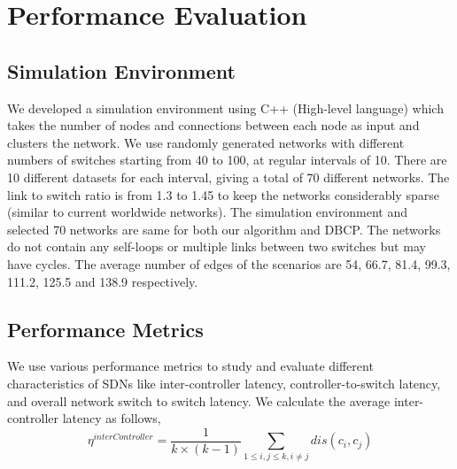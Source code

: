 \documentclass{IEEEtran}
\begin{document}
	\section{Performance Evaluation} \label{performance}
	
	\subsection{Simulation Environment} \label{simulationEnv}
	We developed a simulation environment using C++ (High-level language) which takes the number of nodes and connections between each node as input and clusters the network. We use randomly generated networks with different numbers of switches starting from 40 to 100, at regular intervals of 10. There are 10 different datasets for each interval, giving a total of 70 different networks. The link to switch ratio is from 1.3 to 1.45 to keep the networks considerably sparse (similar to current worldwide networks). The simulation environment and selected 70 networks are same for both our algorithm and DBCP. The networks do not contain any self-loops or multiple links between two switches but may have cycles. The average number of edges of the scenarios are 54, 66.7, 81.4, 99.3, 111.2, 125.5 and 138.9 respectively.
	
	\subsection{Performance Metrics}
	We use various performance metrics to study and evaluate different characteristics of SDNs like inter-controller latency, controller-to-switch latency, and overall network switch to switch latency. We calculate the average inter-controller latency as follows,
	\begin{equation} \label{eqn:interController}
	\eta^{interController} = \frac{1}{k\times(k-1)}\sum_{1\le i,j \le k, i\ne j}dis(c_i,c_j)
	\end{equation}
	
\end{document}
